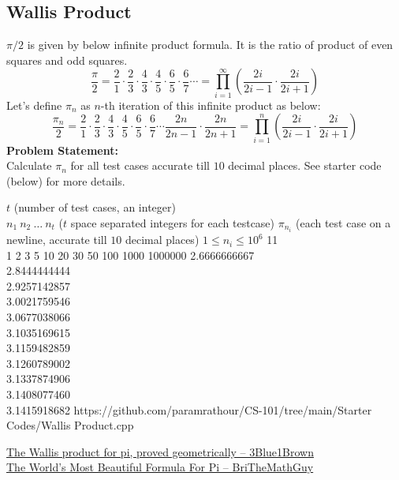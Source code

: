\documentclass[../../Problems]{subfiles}
\begin{document}
\subsection{Wallis Product}{\label{pp:wallis}}
$\pi/2$ is given by below infinite product formula. It is the ratio of product of even squares and odd squares.
\begin{equation}
\frac{\pi}{2} = {\frac {2}{1}}\cdot {\frac {2}{3}}\cdot {\frac {4}{3}}\cdot {\frac {4}{5}}\cdot {\frac {6}{5}}\cdot {\frac {6}{7}}\cdots= \prod _{i=1}^{\infty}\left({\frac {2i}{2i-1}}\cdot {\frac {2i}{2i+1}}\right)
\end{equation}
Let's define $\pi_n$ as $n$-th iteration of this infinite product as below:
\begin{equation*}
\frac{\pi_n}{2} = {\frac {2}{1}}\cdot {\frac {2}{3}}\cdot {\frac {4}{3}}\cdot {\frac {4}{5}}\cdot {\frac {6}{5}}\cdot {\frac {6}{7}}\cdots{\frac {2n}{2n-1}}\cdot {\frac {2n}{2n+1}} = \prod _{i=1}^{n}\left({\frac {2i}{2i-1}}\cdot {\frac {2i}{2i+1}}\right)
\end{equation*}
\textbf{Problem Statement:}\\
Calculate $\pi_n$ for all test cases accurate till $10$ decimal places. See starter code (below) for more details.
\begin{testcases}
	{$t$ \hfill(number of test cases, an integer)\\$n_1\ n_2\ \ldots\ n_t$ \hfill($t$ space separated integers for each testcase)}
	{$\pi_{n_i}$ \hfill(each test case on a newline, accurate till $10$ decimal places)}
	{$1 \leq n_i \leq 10^{6}$}
	{11\\1 2 3 5 10 20 30 50 100 1000 1000000}
	{2.6666666667\\2.8444444444\\2.9257142857\\3.0021759546\\3.0677038066\\3.1035169615\\3.1159482859\\3.1260789002\\3.1337874906\\3.1408077460\\3.1415918682}
	{https://github.com/paramrathour/CS-101/tree/main/Starter Codes/Wallis Product.cpp}
\end{testcases}
\begin{funvideo}
\href{https://youtu.be/8GPy_UMV-08}{The Wallis product for pi, proved geometrically -- 3Blue1Brown}\\
\href{https://youtu.be/k9nRlMDbefc}{The World's Most Beautiful Formula For Pi -- BriTheMathGuy}
\end{funvideo}
\end{document}
